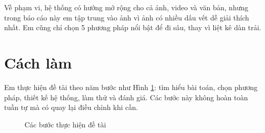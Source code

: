 Về phạm vi, hệ thống có hướng mở rộng cho cả ảnh, video và văn bản, nhưng trong báo cáo này em tập trung vào ảnh vì ảnh có nhiều dấu vết dễ giải thích nhất. Em cũng chỉ chọn 5 phương pháp nổi bật để đi sâu, thay vì liệt kê dàn trải.

\section{Cách làm}
Em thực hiện đề tài theo năm bước như Hình \ref{fig:research-process}: tìm hiểu bài toán, chọn phương pháp, thiết kế hệ thống, làm thử và đánh giá. Các bước này không hoàn toàn tuần tự mà có quay lại điều chỉnh khi cần.

\begin{figure}[h]
\centering
{}
\caption{Các bước thực hiện đề tài}
\label{fig:research-process}
\end{figure}
